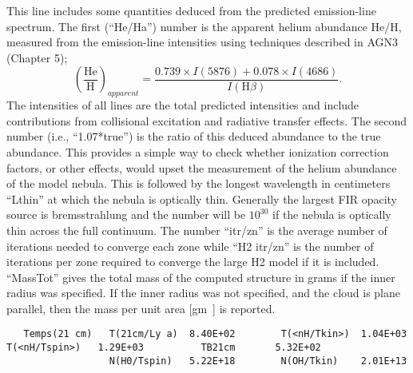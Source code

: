 This line includes some quantities deduced from the predicted emission-line
spectrum.
The first (``He/Ha'') number is the apparent helium abundance He/H,
measured from the emission-line intensities using techniques described in
AGN3 (Chapter 5);
\begin{equation}
{\left( {\frac{{{\mathrm{He}}}}{{\mathrm{H}}}} \right)_{apparent}} = \frac{{0.739
\times I(5876) + 0.078 \times I(4686)}}{{I({\mathrm{H}}\beta )}}.%
\end{equation}
The intensities of all lines are the total predicted intensities and include
contributions from collisional excitation and radiative transfer effects.
The second number (i.e., ``1.07*true'') is the ratio
of this deduced abundance
to the true abundance.
This provides a simple way to check whether
ionization correction factors, or other effects,
would upset the measurement
of the helium abundance of the model nebula.
This is followed by the longest
wavelength in centimeters ``Lthin'' at which the nebula is optically thin.
Generally the largest FIR opacity source is bremsstrahlung and the number
will be $10^{30}$ if the nebula is optically thin across the full continuum.
The number ``itr/zn'' is the average number of iterations needed to converge
each zone while ``H2 itr/zn'' is the number of iterations per zone required
to converge the large H2 model if it is included.
``MassTot'' gives the
total mass of the computed structure in grams if the inner radius
was specified.
If the inner radius was not specified, and the cloud is plane parallel,
then the mass per unit area [gm~\pscm] is reported.

{\setverbatimfontsize{\tiny}
\begin{verbatim}
   Temps(21 cm)   T(21cm/Ly a)  8.40E+02        T(<nH/Tkin>)  1.04E+03          T(<nH/Tspin>)   1.29E+03          TB21cm       5.32E+02
                  N(H0/Tspin)   5.22E+18        N(OH/Tkin)    2.01E+13
\end{verbatim}
}


